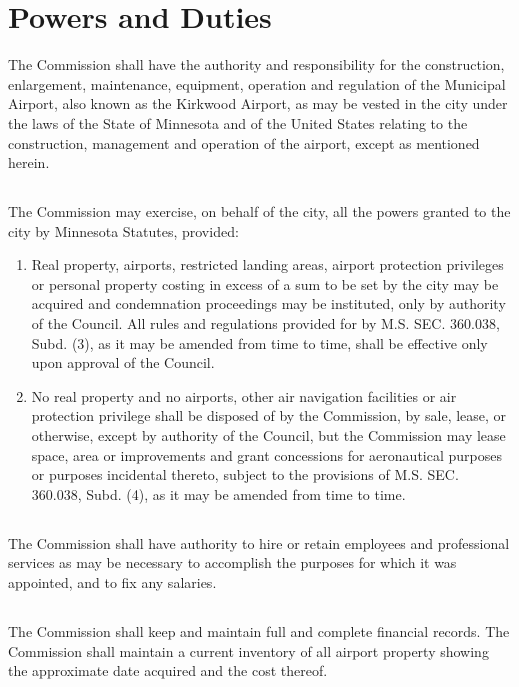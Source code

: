 \section{Powers and Duties}
The Commission shall have the authority and responsibility for the construction, enlargement, maintenance, equipment, operation and regulation of the Municipal Airport, also known as the Kirkwood Airport, as may be vested in the city under the laws of the State of Minnesota and of the United States relating to the construction, management and operation of the airport, except as mentioned herein.
\subsection{}
The Commission may exercise, on behalf of the city, all the powers granted to the city by Minnesota Statutes, provided:
\begin{enumerate}
    \item Real property, airports, restricted landing areas, airport protection privileges or personal property costing in excess of a sum to be set by the city may be acquired and condemnation proceedings may be instituted, only by authority of the Council.  All rules and regulations provided for by M.S. SEC. 360.038, Subd. (3), as it may be amended from time to time, shall be effective only upon approval of the Council.
    \item No real property and no airports, other air navigation facilities or air protection privilege shall be disposed of by the Commission, by sale, lease, or otherwise, except by authority of the Council, but the Commission may lease space, area or improvements and grant concessions for aeronautical purposes or purposes incidental thereto, subject to the provisions of M.S. SEC. 360.038, Subd. (4), as it may be amended from time to time.
\end{enumerate}
\subsection{}
The Commission shall have authority to hire or retain employees and professional services as may be necessary to accomplish the purposes for which it was appointed, and to fix any salaries.
\subsection{}
The Commission shall keep and maintain full and complete financial records.  The Commission shall maintain a current inventory of all airport property showing the approximate date acquired and the cost thereof.

